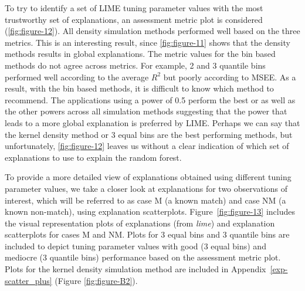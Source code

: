 \documentclass[AMS,STIX2COL]{WileyNJD-v2}\usepackage[]{graphicx}\usepackage[]{color}
\begin{document}
To try to identify a set of LIME tuning parameter values with the most trustworthy set of explanations, an assessment metric plot is considered (\autoref{fig:figure-12}). All density simulation methods performed well based on the three metrics. This is an interesting result, since \autoref{fig:figure-11} shows that the density methods results in global explanations. The metric values for the bin based methods do not agree across metrics. For example, 2 and 3 quantile bins performed well according to the average $R^2$ but poorly according to MSEE. As a result, with the bin based methods, it is difficult to know which method to recommend. The applications using a power of 0.5 perform the best or as well as the other powers across all simulation methods suggesting that the power that leads to a more global explanation is preferred by LIME. Perhaps we can say that the kernel density method or 3 equal bins  are the best performing methods, but unfortunately, \autoref{fig:figure-12} leaves us without a clear indication of which set of explanations to use to explain the random forest. 

To provide a more detailed view of explanations obtained using different tuning parameter values, we take a closer look at explanations  for two observations of interest, which will be referred to as case M (a known match) and case NM (a known non-match), using explanation scatterplots. Figure~\ref{fig:figure-13} includes the visual representation plots of explanations (from \emph{lime}) and explanation scatterplots for cases M and NM. Plots for 3 equal bins and 3 quantile bins are included to depict tuning parameter values with good (3 equal bins) and mediocre (3 quantile bins) performance based on the assessment metric plot. Plots for the kernel density simulation method are included in Appendix~\ref{exp-scatter_plus} (Figure \ref{fig:figure-B2}). 
\end{document}
